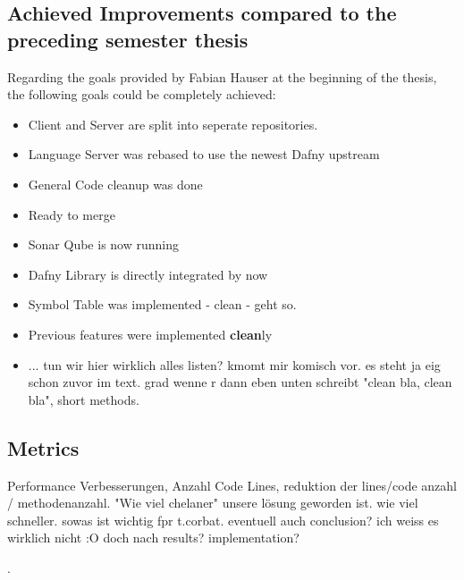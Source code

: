 \subsection{Achieved Improvements compared to the preceding semester thesis}
Regarding the goals provided by Fabian Hauser at the beginning of the thesis, the following goals could be completely achieved:
\begin{itemize}
    \item Client and Server are split into seperate repositories.
    \item Language Server was rebased to use the newest Dafny upstream
    \item General Code cleanup was done
    \item Ready to merge
    \item Sonar Qube is now running
    \item Dafny Library is directly integrated by now
    \item Symbol Table was implemented - clean - geht so.
    \item Previous features were implemented \textbf{clean}ly
    \item ... tun wir hier wirklich alles listen? kmomt mir komisch vor. es steht ja eig schon zuvor im text. grad wenne r dann eben unten schreibt "clean bla, clean bla", short methods.
\end{itemize}





\subsection{Metrics}

Performance Verbesserungen, Anzahl Code Lines, reduktion der lines/code anzahl / methodenanzahl.
"Wie viel chelaner" unsere lösung geworden ist. wie viel schneller. sowas ist wichtig fpr t.corbat. 
eventuell auch conclusion? ich weiss es wirklich nicht :O doch nach results? implementation?

.